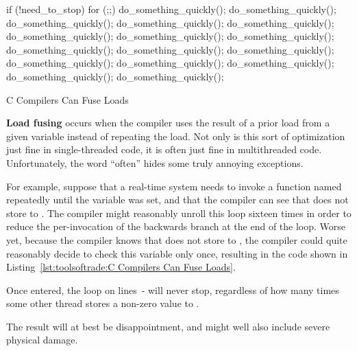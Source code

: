 \begin{listing}[tbp]
\begin{linelabel}
\begin{VerbatimL}[commandchars=\\\[\]]
if (!need_to_stop)
	for (;;) {\lnlbl[loop:b]
		do_something_quickly();
		do_something_quickly();
		do_something_quickly();
		do_something_quickly();
		do_something_quickly();
		do_something_quickly();
		do_something_quickly();
		do_something_quickly();
		do_something_quickly();
		do_something_quickly();
		do_something_quickly();
		do_something_quickly();
		do_something_quickly();
		do_something_quickly();
		do_something_quickly();
		do_something_quickly();
	}\lnlbl[loop:e]
\end{VerbatimL}
\end{linelabel}
\caption{C Compilers Can Fuse Loads}
\label{lst:toolsoftrade:C Compilers Can Fuse Loads}
\end{listing}

{\bf Load fusing} occurs when the compiler uses the result of a
prior load from a given variable instead of repeating the load.
Not only is this sort of optimization just fine in single-threaded
code, it is often just fine in multithreaded code.
Unfortunately, the word ``often'' hides some truly annoying exceptions.

For example, suppose that a real-time system needs to invoke a
function named  repeatedly until the
variable  was set, and that the compiler can see
that  does not store to .
The compiler might reasonably unroll this loop sixteen times in order
to reduce the per-invocation of the backwards branch at the end of the
loop.
Worse yet, because the compiler knows that 
does not store to , the compiler could quite reasonably
decide to check this variable only once, resulting in the code shown in
Listing~\ref{lst:toolsoftrade:C Compilers Can Fuse Loads}.
\begin{lineref}
Once entered, the loop on
lines~- will never stop, regardless of how
many times some other thread stores a non-zero value to .
\end{lineref}
The result will at best be disappointment, and might well also
include severe physical damage.

